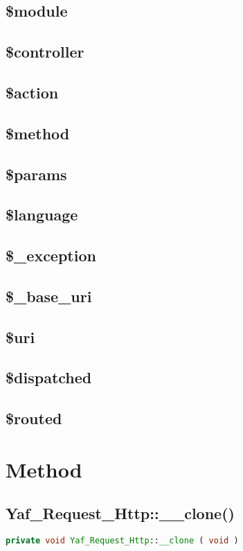 \subsection{\$module}
\subsection{\$controller}
\subsection{\$action}
\subsection{\$method}
\subsection{\$params}
\subsection{\$language}
\subsection{\$\_exception}
\subsection{\$\_base\_uri}
\subsection{\$uri}
\subsection{\$dispatched}
\subsection{\$routed}

\section{Method}


\subsection{Yaf\_Request\_Http::\_\_clone()}



\begin{lstlisting}[language=PHP]
private void Yaf_Request_Http::__clone ( void )
\end{lstlisting}

